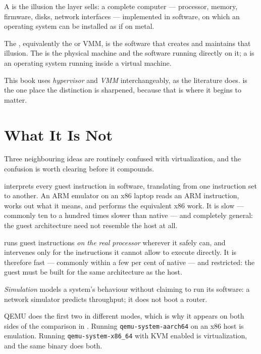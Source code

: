 \begin{definitionbox}
A  is the illusion the layer sells: a complete computer
--- processor, memory, firmware, disks, network interfaces --- implemented in
software, on which an operating system can be installed as if on metal.

\smallskip
The , equivalently the  or VMM,
is the software that creates and maintains that illusion. The  is the
physical machine and the software running directly on it; a  is an
operating system running inside a virtual machine.

\smallskip
This book uses \emph{hypervisor} and \emph{VMM} interchangeably, as the
literature does.  is the one place the distinction is sharpened,
because that is where it begins to matter.
\end{definitionbox}

\section{What It Is Not}

Three neighbouring ideas are routinely confused with virtualization, and the
confusion is worth clearing before it compounds.

\begin{conceptbox}
 interprets every guest instruction in software, translating
from one instruction set to another. An ARM emulator on an x86 laptop reads an
ARM instruction, works out what it means, and performs the equivalent x86 work.
It is slow --- commonly ten to a hundred times slower than native --- and
completely general: the guest architecture need not resemble the host at all.

\smallskip
{} runs guest instructions \emph{on the real processor}
wherever it safely can, and intervenes only for the instructions it cannot allow
to execute directly. It is therefore fast --- commonly within a few per cent of
native --- and restricted: the guest must be built for the same architecture as
the host.

\smallskip
\emph{Simulation} models a system's behaviour without claiming to run its
software: a network simulator predicts throughput; it does not boot a router.

\smallskip
QEMU does the first two in different modes, which is why it appears on both
sides of the comparison in . Running
\texttt{qemu-system-aarch64} on an x86 host is emulation. Running
\texttt{qemu-system-x86\_64} with KVM enabled is virtualization, and the same
binary does both.
\end{conceptbox}

